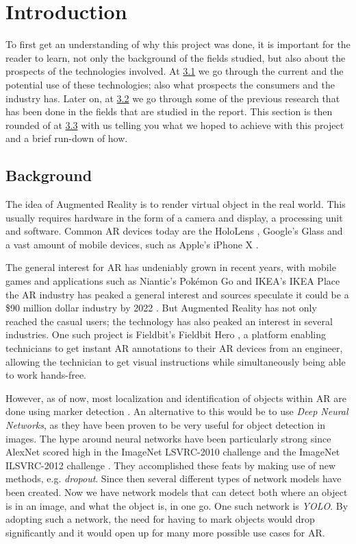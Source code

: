 \section{Introduction}
To first get an understanding of why this project was done, it is important for the reader to learn, not only the background of the fields studied, but also about the prospects of the technologies involved.
 At \hyperref[subsecBackground]{3.1} we go through the current and the potential use of these technologies; also what prospects the consumers and the industry has. Later on, at  \hyperref[subsecPrevStud]{3.2} we go through some of the previous research that has been done in the fields that are studied in the report. This section is then rounded of at \hyperref[subsecGoal]{3.3} with us telling you what we hoped to achieve with this project and a brief run-down of how.

\subsection{Background}
\label{subsecBackground}
The idea of Augmented Reality is to render virtual object in the real world. This usually requires hardware in the form of a camera and display, a processing unit and software. Common AR devices today are the HoloLens \cite{microsoft}, Google's Glass \cite{googleGlasses} and a vast amount of mobile devices, such as Apple's iPhone X \cite{appleAR}. 

The general interest for AR has undeniably grown in recent years, with mobile games and applications such as Niantic's Pokémon Go \cite{pokemonGO} and IKEA's IKEA Place \cite{IKEAPlace} the AR industry has peaked a general interest and sources speculate it could be a \$90 million dollar industry by 2022 \cite{digi-capital}.
 But Augmented Reality has not only reached the casual users; the technology has also peaked an interest in several industries. One such project is Fieldbit's Fieldbit Hero \cite{fieldbit}, a platform enabling technicians to get instant AR annotations to their AR devices from an engineer, allowing the technician to get visual instructions while simultaneously  being able to work hands-free. 
 
However, as of now, most localization and identification of objects within AR are done using marker detection \cite{markerDetection}. An alternative to this would be to use \textit{Deep Neural Networks}, as they have been proven to be very useful for object detection in images. The hype around neural networks have been particularly strong since AlexNet scored high in the ImageNet LSVRC-2010 challenge and the ImageNet ILSVRC-2012 challenge \cite{NIPS2012_4824}. They accomplished these feats by making use of new methods, e.g. \textit{dropout}. Since then several different types of network models have been created. Now we have network models that can detect both where an object is in an image, and what the object is, in one go. One such network is \textit{YOLO}\cite{YOLO1}. By adopting such a network, the need for having to mark objects would drop significantly and it would open up for many more possible use cases for AR.
 
